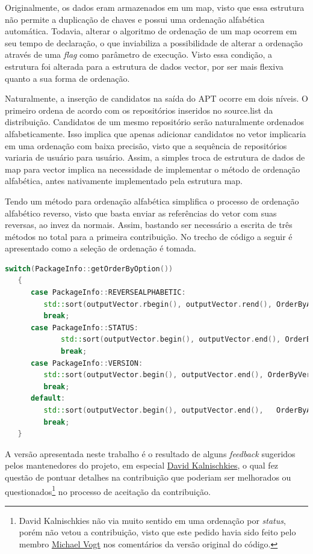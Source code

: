 Originalmente, os dados eram armazenados em um {\code map}, visto que essa estrutura não permite a duplicação de chaves e possui uma ordenação alfabética automática. Todavia, alterar o algoritmo de ordenação de um {\code map} ocorrem em seu tempo de declaração, o que  inviabiliza a possibilidade de alterar a ordenação através de uma \textit{flag} como parâmetro de execução. Visto essa condição, a estrutura foi alterada para a estrutura de dados {\code vector}, por ser mais flexiva quanto a sua forma de ordenação.

Naturalmente, a inserção de candidatos na saída do APT ocorre  em dois níveis. O primeiro ordena de acordo com os repositórios inseridos no {\code source.list} da distribuição. Candidatos de um mesmo repositório serão naturalmente ordenados alfabeticamente. Isso implica que apenas adicionar candidatos no vetor implicaria em uma ordenação com baixa precisão, visto que a sequência de repositórios variaria de usuário para usuário. Assim, a simples troca de estrutura de dados de {\code map} para {\code vector} implica na necessidade de implementar o método de ordenação alfabética, antes nativamente implementado pela estrutura {\code map}.

Tendo um método para ordenação alfabética simplifica o processo de ordenação alfabético reverso, visto que basta enviar as referências do vetor com suas reversas, ao invez da normais. Assim, bastando ser necessário a escrita de três métodos no total para a primeira contribuição. No trecho de código a seguir é apresentado como a seleção de ordenação é tomada.


\begin{lstlisting}[language=C++,label=choose_pr1,caption={Tomada de decisão de ordenação}]
   switch(PackageInfo::getOrderByOption())
   {
      case PackageInfo::REVERSEALPHABETIC:
		 std::sort(outputVector.rbegin(), outputVector.rend(), OrderByAlphabetic);
		 break;
      case PackageInfo::STATUS:
			 std::sort(outputVector.begin(), outputVector.end(), OrderByStatus);
			 break;
      case PackageInfo::VERSION:
		 std::sort(outputVector.begin(), outputVector.end(), OrderByVersion);
		 break;
      default:
		 std::sort(outputVector.begin(), outputVector.end(),   OrderByAlphabetic);
		 break;
   }
\end{lstlisting}

A versão apresentada neste trabalho é o resultado de alguns \textit{feedback} sugeridos pelos mantenedores do projeto, em especial \href{https://github.com/DonKult}{David Kalnischkies}, o qual fez questão de pontuar detalhes na contribuição que poderiam ser melhorados ou questionados\footnote{David Kalnischkies não via muito sentido em uma ordenação por \textit{status}, porém não vetou a contribuição, visto que este pedido havia sido feito pelo membro \href{https://github.com/mvo5}{Michael Vogt} nos comentários da versão original do código.} no processo de aceitação da contribuição.


